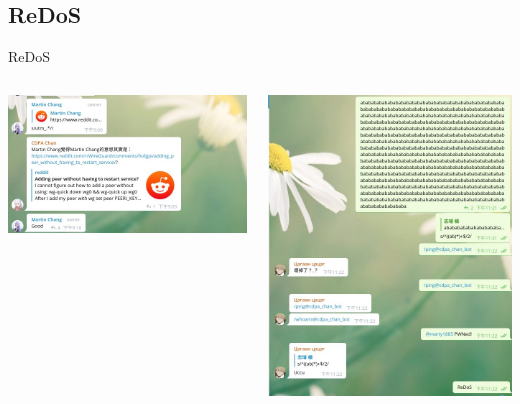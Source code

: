 \documentclass{beamer}
\begin{document}
\begin{CJK*}{UTF8}{bsmi}
    \subsection{ReDoS}
    \begin{frame}{ReDoS}
        \centering
        \begin{columns}
            \begin{column}{0.5\textwidth}
                \includegraphics[width=1.1\textwidth]{redos1.jpg}
            \end{column}
            \begin{column}{0.5\textwidth}
                \includegraphics[width=1.1\textwidth]{redos2.jpg}
            \end{column}
        \end{columns}
    \end{frame}


\end{CJK*}
\end{document}
